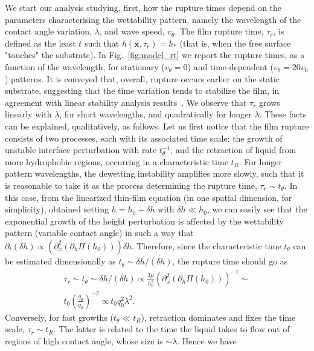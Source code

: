 \documentclass[twocolumn,amsmath,amssymb,showpacs,prl,superscriptaddress]{revtex4-1} %
\begin{document}
 We start our analysis studying, first, how the rupture times depend on the parameters characterising the wettability pattern, namely the wavelength of the contact angle variation, $\lambda$, and wave speed, $v_{\theta}$.
The film rupture time, $\tau_r$, is defined as the least $t$ such that $h(\mathbf{x},\tau_r)=h_{\ast}$ (that is, when the free surface "touches" the substrate).
In Fig.~\ref{fig:model_rt} we report the rupture times, as a function of the wavelength, for stationary ($v_{\theta}=0$) and time-dependent ($v_{\theta}=20 v_0$) patterns. 
It is conveyed that, overall, rupture occurs earlier on the static substrate, suggesting that the time variation tends to stabilize the film, in agreement with linear stability analysis results~\cite{suman2006dynamics}.
We observe that $\tau_r$ grows linearly with $\lambda$, for short wavelengths, and quadratically for longer $\lambda$.
These facts can be explained, qualitatively, as follows. 
Let us first notice that the film rupture consists of two processes, each with its associated time scale: the growth of unstable interface perturbation with rate $t_{\theta}^{-1}$, and the retraction of liquid from more hydrophobic regions, occurring in a characteristic time $t_R$. For longer pattern wavelengths, the dewetting instability amplifies more slowly, such that it is reasonable to take it as the process determining the rupture time, $\tau_r \sim t_{\theta}$.
In this case, from the linearized thin-film equation (in one spatial dimension, for simplicity), obtained setting $h=h_0 + \delta h$ with $\delta h \ll h_0$, 
we can easily see that the exponential growth of the height perturbation is affected by the wettability pattern (variable contact angle) in such a way that $\partial_t (\delta h) \propto (\partial_x^2 (\partial_h\Pi(h_0))) \delta h$. Therefore, since the characteristic time $t_{\theta}$ can be estimated dimensionally as $t_{\theta} \sim \delta h/\dot{(\delta h)}$, the rupture time should go as
\begin{multline}\label{eq:taur_l2}
    \tau_r \sim t_{\theta} \sim  \delta h/\dot{(\delta h)} \propto \frac{3\mu}{h_0^3}(\partial_x^2 (\partial_h\Pi (h_0)))^{-1} \sim \\
    t_0 \left(\frac{q_{\theta}}{q_0}\right)^{-2} \propto t_0 q_0^2 \lambda^2.
\end{multline}
Conversely, for fast growths ($t_{\theta} \ll t_R$), retraction dominates and fixes the time scale, $\tau_r \sim t_R$. 
The latter is related to the time the liquid takes to flow out of regions of high contact angle, whose size is $\sim \lambda$. Hence we have 
\end{document}

